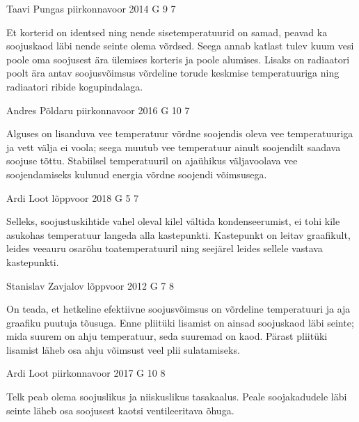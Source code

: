 \documentclass[11pt]{article}
\begin{document}
{%
{Taavi Pungas} %
{piirkonnavoor} %
{2014} %
{G 9} %
{7} %
{

\ifHint
Et korterid on identsed ning nende sisetemperatuurid on samad, peavad ka soojuskaod läbi nende seinte olema võrdsed. Seega annab katlast tulev kuum vesi poole oma soojusest ära ülemises korteris ja poole alumises. Lisaks on radiaatori poolt ära antav soojusvõimsus võrdeline torude keskmise temperatuuriga ning radiaatori ribide kogupindalaga.
\fi
}

{Andres Põldaru} %
{piirkonnavoor} %
{2016} %
{G 10} %
{7} %
{

\ifHint
Alguses on lisanduva vee temperatuur võrdne soojendis oleva vee temperatuuriga ja vett välja ei voola; seega muutub vee temperatuur ainult soojendilt saadava soojuse tõttu. Stabiilsel temperatuuril on ajaühikus väljavoolava vee soojendamiseks kulunud energia võrdne soojendi võimsusega.
\fi
}

{Ardi Loot} %
{lõppvoor} %
{2018} %
{G 5} %
{7} %
{

\ifHint
Selleks, soojustuskihtide vahel oleval kilel vältida kondenseerumist, ei tohi kile asukohas temperatuur
langeda alla kastepunkti. Kastepunkt on leitav graafikult, leides veeauru osarõhu toatemperatuuril ning seejärel leides sellele vastava kastepunkti.
\fi
}

{Stanislav Zavjalov} %
{lõppvoor} %
{2012} %
{G 7} %
{8} %
{

\ifHint
On teada, et hetkeline efektiivne soojusvõimsus on võrdeline temperatuuri ja aja graafiku puutuja tõusuga. Enne pliitüki lisamist on ainsad soojuskaod läbi seinte; mida suurem on ahju temperatuur, seda suuremad on kaod. Pärast pliitüki lisamist läheb osa ahju võimsust veel plii sulatamiseks.
\fi
}

{Ardi Loot} %
{piirkonnavoor} %
{2017} %
{G 10} %
{8} %
{

\ifHint
Telk peab olema soojuslikus ja niiskuslikus tasakaalus. Peale soojakadudele läbi seinte läheb osa soojusest kaotsi ventileeritava õhuga.
\fi
}

}
\end{document}
